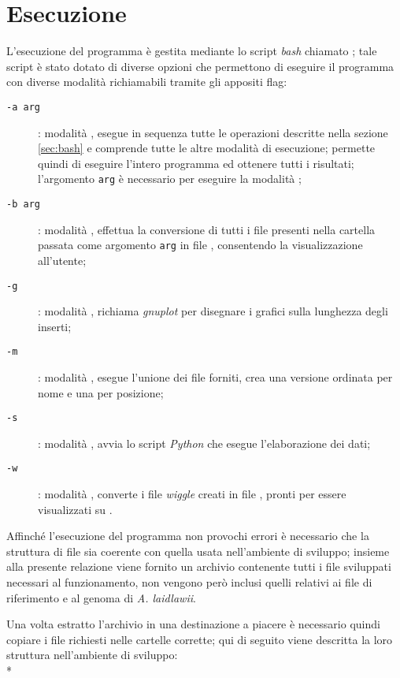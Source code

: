 \clearpage
\section{Esecuzione}
L'esecuzione del programma è gestita mediante lo script \emph{bash} chiamato ; tale script è stato dotato di diverse opzioni che permettono di eseguire il programma con diverse modalità richiamabili tramite gli appositi flag:

\begin{description}
\item[\texttt{-a arg}]: modalità , esegue in sequenza tutte le operazioni descritte nella sezione \ref{sec:bash} e comprende tutte le altre modalità di esecuzione; permette quindi di eseguire l'intero programma ed ottenere tutti i risultati; l'argomento \texttt{arg} è necessario per eseguire la modalità ;
\item[\texttt{-b arg}]: modalità , effettua la conversione di tutti i file  presenti nella cartella passata come argomento \texttt{arg} in file , consentendo la visualizzazione all'utente;
\item[\texttt{-g}]: modalità , richiama \emph{gnuplot} per disegnare i grafici sulla lunghezza degli inserti;
\item[\texttt{-m}]: modalità , esegue l'unione dei file  forniti, crea una versione ordinata per nome e una per posizione;
\item[\texttt{-s}]: modalità , avvia lo script \emph{Python} che esegue l'elaborazione dei dati;
\item[\texttt{-w}]: modalità , converte i file \emph{wiggle} creati in file , pronti per essere visualizzati su .
\end{description}

Affinché l'esecuzione del programma non provochi errori è necessario che la struttura di file sia coerente con quella usata nell'ambiente di sviluppo; insieme alla presente relazione viene fornito un archivio contenente tutti i file sviluppati necessari al funzionamento, non vengono però inclusi quelli relativi ai file  di riferimento e al genoma di \emph{A. laidlawii}.

Una volta estratto l'archivio in una destinazione a piacere è necessario quindi copiare i file richiesti nelle cartelle corrette; qui di seguito viene descritta la loro struttura nell'ambiente di sviluppo:\\*

